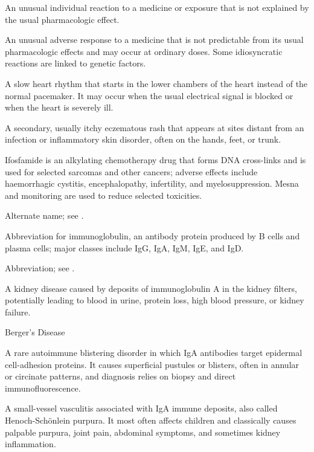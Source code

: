  An unusual individual reaction to a medicine or exposure that is not explained by the usual pharmacologic effect.

 An unusual adverse response to a medicine that is not predictable from its usual pharmacologic effects and may occur at ordinary doses. Some idiosyncratic reactions are linked to genetic factors.

 A slow heart rhythm that starts in the lower chambers of the heart instead of the normal pacemaker. It may occur when the usual electrical signal is blocked or when the heart is severely ill.

 A secondary, usually itchy eczematous rash that appears at sites distant from an infection or inflammatory skin disorder, often on the hands, feet, or trunk.

 Ifosfamide is an alkylating chemotherapy drug that forms DNA cross-links and is used for selected sarcomas and other cancers; adverse effects include haemorrhagic cystitis, encephalopathy, infertility, and myelosuppression. Mesna and monitoring are used to reduce selected toxicities.

 Alternate name; see .

 Abbreviation for immunoglobulin, an antibody protein produced by B cells and plasma cells; major classes include IgG, IgA, IgM, IgE, and IgD.

 Abbreviation; see .

 A kidney disease caused by deposits of immunoglobulin A in the kidney filters, potentially leading to blood in urine, protein loss, high blood pressure, or kidney failure.

\synonyms
Berger's Disease

 A rare autoimmune blistering disorder in which IgA antibodies target epidermal cell-adhesion proteins. It causes superficial pustules or blisters, often in annular or circinate patterns, and diagnosis relies on biopsy and direct immunofluorescence.

 A small-vessel vasculitis associated with IgA immune deposits, also called Henoch-Schönlein purpura. It most often affects children and classically causes palpable purpura, joint pain, abdominal symptoms, and sometimes kidney inflammation.

